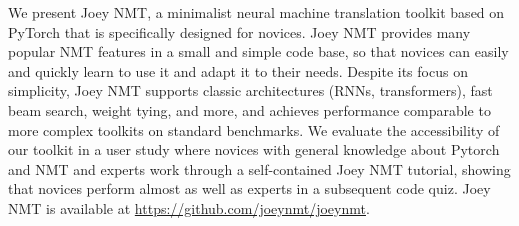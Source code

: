 We present Joey NMT, a minimalist neural machine translation toolkit based on PyTorch that is specifically designed for novices. Joey NMT provides many popular NMT features in a small and simple code base, so that novices can easily and quickly learn to use it and adapt it to their needs. Despite its focus on simplicity, Joey NMT supports classic architectures (RNNs, transformers), fast beam search, weight tying, and more, and achieves performance comparable to more complex toolkits on standard benchmarks.
We evaluate the accessibility of our toolkit in a user study where novices with general knowledge about Pytorch and NMT and experts work through a self-contained Joey NMT tutorial, showing that novices perform almost as well as experts in a subsequent code quiz. 
Joey NMT is available at \url{https://github.com/joeynmt/joeynmt}.